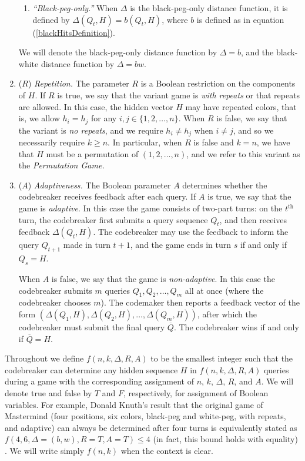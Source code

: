 \documentclass[12pt, a4paper]{article}
\newcommand{\nth}{^{\text{th}}}       %
\begin{document}
\begin{enumerate}[label=(\roman*)]
\begin{enumerate}[label=\alph*.]
		\item\textit{``Black-peg-only.''} When $\Delta$ is the black-peg-only distance function, it is defined by $\Delta(Q_t, H) = b(Q_t, H)$, where $b$ is defined as in equation (\ref{blackHitsDefinition}).
	\end{enumerate}
	We will denote the black-peg-only distance function by $\Delta = b$, and the black-white distance function by $\Delta = bw$.
	
	\item($R$) \textit{Repetition.} The parameter $R$ is a Boolean restriction on the components of $H$. If $R$ is true, we say that the variant game is \textit{with repeats} or that repeats are allowed. In this case, the hidden vector $H$ may have repeated colors, that is, we allow $h_i = h_j$ for any $i,j\in\{1,2,\ldots, n\}$. When $R$ is false, we say that the variant is \textit{no repeats}, and we require $h_i\neq h_j$ when $i\neq j$, and so we necessarily require $k \geq n$. In particular, when $R$ is false and $k = n$, we have that $H$ must be a permutation of $(1, 2, \ldots, n)$, and we refer to this variant as the \textit{Permutation Game.}
	
	\item($A$) \textit{Adaptiveness.} The Boolean parameter $A$ determines whether the codebreaker receives feedback after each query. If $A$ is true, we say that the game is \textit{adaptive}. In this case the game consists of two-part turns: on the $t\nth$ turn, the codebreaker first submits a query sequence $Q_t$, and then receives feedback $\Delta(Q_t, H)$. The codebreaker may use the feedback to inform the query $Q_{t+1}$ made in turn $t+1$, and the game ends in turn $s$ if and only if $Q_s = H$.
	
	When $A$ is false, we say that the game is \textit{non-adaptive}. In this case the codebreaker submits $m$ queries $Q_1, Q_2, \ldots, Q_m$ all at once (where the codebreaker chooses $m$). The codemaker then reports a feedback vector of the form $(\Delta(Q_1, H), \Delta(Q_2, H), \ldots, \Delta(Q_m, H))$, after which the codebreaker must submit the final query $\overline{Q}$. The codebreaker wins if and only if $\overline{Q} = H$.
\end{enumerate}

Throughout we define $f(n, k, \Delta, R, A)$ to be the smallest integer such that the codebreaker can determine any hidden sequence $H$ in $f(n, k, \Delta, R, A)$ queries during a game with the corresponding assignment of $n$, $k$, $\Delta$, $R$, and $A$. We will denote true and false by $T$ and $F$, respectively, for assignment of Boolean variables. For example, Donald Knuth's result that the original game of Mastermind (four positions, six colors, black-peg and white-peg, with repeats, and adaptive) can always be determined after four turns is equivalently stated as $f(4, 6, \Delta = (b,w), R=T, A=T)\le 4$ (in fact, this bound holds with equality) \cite{DK76}. We will write simply $f(n, k)$ when the context is clear.
\end{document}
